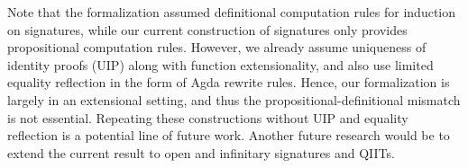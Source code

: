 Note that the \cite{qiit} formalization assumed definitional computation rules
for induction on signatures, while our current construction of signatures only
provides propositional computation rules. However, we already assume uniqueness
of identity proofs (UIP) along with function extensionality, and also use limited
equality reflection in the form of Agda rewrite rules. Hence, our formalization
is largely in an extensional setting, and thus the propositional-definitional
mismatch is not essential. Repeating these constructions without UIP and equality
reflection is a potential line of future work. Another future research would be to
extend the current result to open and infinitary signatures and QIITs.
